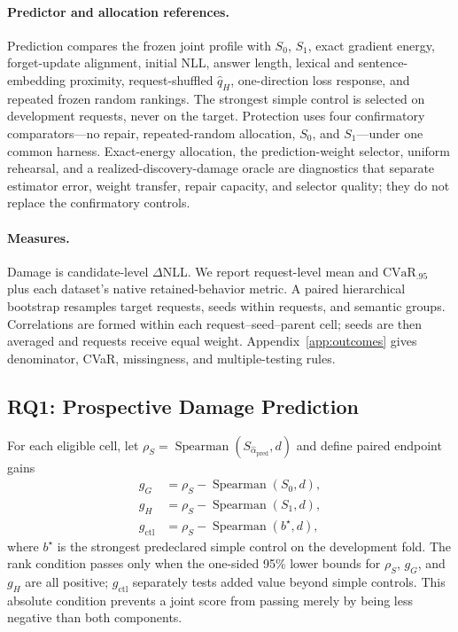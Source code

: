 \paragraph{Predictor and allocation references.}
Prediction compares the frozen joint profile with $S_0$, $S_1$, exact gradient
energy, forget-update alignment, initial NLL, answer length, lexical and
sentence-embedding proximity, request-shuffled $\widehat q_H$, one-direction
loss response, and repeated frozen random rankings. The strongest simple
control is selected on development requests, never on the target. Protection
uses four confirmatory comparators---no repair, repeated-random allocation,
$S_0$, and $S_1$---under one common harness. Exact-energy allocation, the
prediction-weight selector, uniform rehearsal, and a realized-discovery-damage
oracle are diagnostics that separate estimator error, weight transfer, repair
capacity, and selector quality; they do not replace the confirmatory controls.

\paragraph{Measures.}
Damage is candidate-level $\Delta$NLL. We report request-level mean and
$\mathrm{CVaR}_{.95}$ plus each dataset's native retained-behavior metric. A
paired hierarchical bootstrap resamples target requests, seeds within
requests, and semantic groups. Correlations are formed within each
request--seed--parent cell; seeds are then averaged and requests receive equal
weight. Appendix~\ref{app:outcomes} gives denominator, CVaR, missingness, and
multiple-testing rules.

\subsection{RQ1: Prospective Damage Prediction}
\label{sec:exp-prediction}

For each eligible cell, let
$\rho_S=\operatorname{Spearman}(S_{\widehat\alpha_{\mathrm{pred}}},d)$ and
define paired endpoint gains
\begin{equation}
\begin{aligned}
  g_G&=\rho_S-\operatorname{Spearman}(S_0,d),\\
  g_H&=\rho_S-\operatorname{Spearman}(S_1,d),\\
  g_{\mathrm{ctl}}&=\rho_S-\operatorname{Spearman}(b^\star,d),
\end{aligned}
\label{eq:paired-prediction-gains}
\end{equation}
where $b^\star$ is the strongest predeclared simple control on the development
fold. The rank condition passes only when the one-sided 95\% lower bounds for
$\rho_S$, $g_G$, and $g_H$ are all positive; $g_{\mathrm{ctl}}$ separately
tests added value beyond simple controls. This absolute condition prevents a
joint score from passing merely by being less negative than both components.

